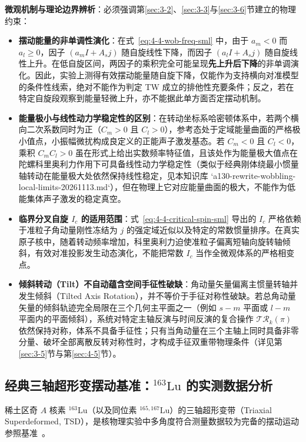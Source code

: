\textbf{微观机制与理论边界辨析}：必须强调第\ref{sec:3-2}、\ref{sec:3-3}与\ref{sec:3-6}节建立的物理约束：
\begin{itemize}
\item \textbf{摆动能量的非单调性演化}：在式~\eqref{eq:4-4-wob-freq-sml} 中，由于 $a_m < 0$ 而 $a_l \ge 0$，因子 $(a_m I + A_s j)$ 随自旋线性下降，而因子 $(a_l I + A_s j)$ 随自旋线性上升。在低自旋区间，两因子的乘积完全可能呈现\textbf{先上升后下降}的非单调演化。因此，实验上测得有效摆动能量随自旋下降，仅能作为支持横向对准模型的条件性线索，绝对不能作为判定 TW 成立的排他性充要条件；反之，若在特定自旋段观察到能量轻微上升，亦不能据此单方面否定摆动机制。
\item \textbf{能量极小与线性动力学稳定性的区别}：在转动坐标系哈密顿体系中，若两个横向二次系数同时为正（$C_m > 0$ 且 $C_l > 0$），参考态处于定域能量曲面的严格极小值点，小振幅微扰构成良定义的正能声子激发基态。若 $C_m < 0$ 且 $C_l < 0$，乘积 $C_m C_l > 0$ 虽在形式上给出实数频率特征值，且该处作为能量极大值点在陀螺科里奥利力作用下可具备线性动力学稳定性（类似于经典刚体绕最小惯量轴转动在能量极大处依然保持线性稳定，见本知识库 `a130-rewrite-wobbling-local-limits-20261113.md`），但在物理上它对应能量曲面的极大，不能作为低能集体声子激发的稳定真空。
\item \textbf{临界分叉自旋 $I_c$ 的适用范围}：式~\eqref{eq:4-4-critical-spin-sml} 导出的 $I_c$ 严格依赖于准粒子角动量刚性冻结为 $j$ 的强定域近似以及特定的常数惯量排序。在真实原子核中，随着转动频率增加，科里奥利力迫使准粒子偏离短轴向旋转轴倾斜，有效对准投影发生动态演化，不能把常数 $I_c$ 当作全微观体系的严格相变点。
\item \textbf{倾斜转动（Tilt）不自动蕴含空间手征性破缺}：角动量矢量偏离主惯量转轴并发生倾斜（Tilted Axis Rotation），并不等价于手征对称性破缺。若总角动量矢量的倾斜轨迹完全局限在三个几何主平面之一（例如 $s-m$ 平面或 $l-m$ 平面内的平面倾斜），系统对特定主轴反演与时间反演的复合操作 $\mathcal{T}\mathcal{R}_k(\pi)$ 依然保持对称，体系不具备手征性；只有当角动量在三个主轴上同时具备非零分量、破坏全部离散反转对称性时，才构成手征双重带物理条件（详见第\ref{sec:3-5}节与第\ref{sec:4-5}节）。
\end{itemize}

\subsection{经典三轴超形变摆动基准：$^{163}\mathrm{Lu}$ 的实测数据分析}\label{sec:4-4-2}

稀土区奇 $A$ 核素 $^{163}\mathrm{Lu}$（以及同位素 $^{165,167}\mathrm{Lu}$）的三轴超形变带（Triaxial Superdeformed, TSD），是核物理实验中多角度符合测量数据较为完备的摆动运动参照基准~\cite{odegard-2001-evidence-wobbling-163lu,jensen-2002-second-phonon-wobbling-163lu,campaign-g07-gorgen-2004-163lu-quadrupole-moments}。

